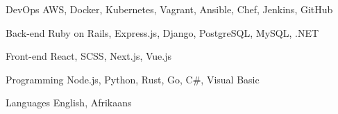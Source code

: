 

\begin{cvskills}

  \cvskill
    {DevOps} %
    {AWS, Docker, Kubernetes, Vagrant, Ansible, Chef, Jenkins, GitHub} %

  \cvskill
    {Back-end} %
    {Ruby on Rails, Express.js, Django, PostgreSQL, MySQL, .NET} %

  \cvskill
    {Front-end} %
    {React, SCSS, Next.js, Vue.js}%

  \cvskill
    {Programming} %
    {Node.js, Python, Rust, Go, C#, Visual Basic} %

  \cvskill
    {Languages} %
    {English, Afrikaans} %

\end{cvskills}
